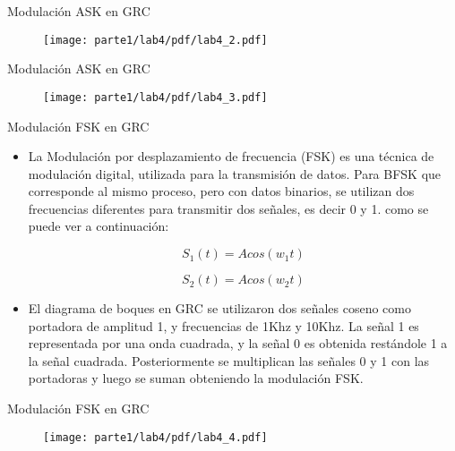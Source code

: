 \begin{frame}{Modulación ASK en GRC}
\vspace{-1cm}
\begin{figure}[H]
\centering
\texttt{[image: parte1/lab4/pdf/lab4\_2.pdf]}
\end{figure}
\end{frame}

\begin{frame}{Modulación ASK en GRC}
\vspace{-1.5cm}
\begin{figure}[H]
\centering
\texttt{[image: parte1/lab4/pdf/lab4\_3.pdf]}
\end{figure}
\end{frame}

\begin{frame}{Modulación FSK en GRC}

  \begin{itemize}
  \item {
La Modulación por desplazamiento de frecuencia (FSK) es una técnica de modulación digital, utilizada para la transmisión de datos. Para BFSK que corresponde al mismo proceso, pero con datos binarios, se utilizan dos frecuencias diferentes para transmitir dos señales, es decir 0 y 1. como se puede ver a continuación:

\begin{equation*}
S_{1}(t) = Acos(w_{1}t)
\end{equation*}

\begin{equation*}
S_{2}(t) = Acos(w_{2}t)
\end{equation*}

  }
  \item {
El diagrama de boques en GRC se utilizaron dos señales coseno como portadora de amplitud 1, y frecuencias de 1Khz y 10Khz. La señal 1 es representada por una onda cuadrada, y la señal 0 es obtenida restándole 1 a la señal cuadrada. Posteriormente se multiplican las señales 0 y 1 con las portadoras y luego se suman obteniendo la modulación FSK.
  }
  \end{itemize}
\end{frame}


\begin{frame}{Modulación FSK en GRC}
\vspace{-8mm}
\begin{figure}[H]
\centering
\texttt{[image: parte1/lab4/pdf/lab4\_4.pdf]}
\end{figure}
\end{frame}

